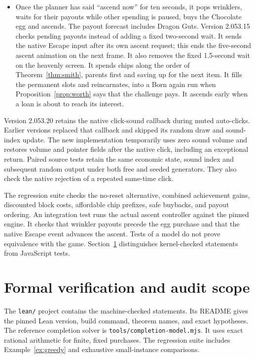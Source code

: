 \documentclass[11pt,a4paper]{article}
\numberwithin{equation}{section}
\theoremstyle{definition}
\theoremstyle{remark}
\begin{document}
\begin{itemize}
\item Once the planner has said ``ascend now'' for ten seconds, it pops wrinklers, waits for their payouts while other spending is paused, buys the Chocolate egg and ascends. The payout forecast includes Dragon Guts. Version 2.053.15 checks pending payouts instead of adding a fixed two-second wait. It sends the native Escape input after its own ascent request; this ends the five-second ascent animation on the next frame. It also removes the fixed 1.5-second wait on the heavenly screen. It spends chips along the order of Theorem~\ref{thm:smith}, parents first and saving up for the next item. It fills the permanent slots and reincarnates, into a Born again run when Proposition~\ref{prop:worth} says that the challenge pays. It ascends early when a loan is about to reach its interest.
\end{itemize}
Version 2.053.20 retains the native click-sound callback during muted auto-clicks. Earlier versions replaced that callback and skipped its random draw and sound-index update. The new implementation temporarily uses zero sound volume and restores volume and pointer fields after the native click, including an exceptional return. Paired source tests retain the same economic state, sound index and subsequent random output under both free and seeded generators. They also check the native rejection of a repeated same-time click.

The regression suite checks the no-reset alternative, combined achievement gains, discounted block costs, affordable chip prefixes, safe buybacks, and payout ordering. An integration test runs the actual ascent controller against the pinned engine. It checks that wrinkler payouts precede the egg purchase and that the native Escape event advances the ascent. Tests of a model do not prove equivalence with the game. Section~\ref{sec:formal} distinguishes kernel-checked statements from JavaScript tests.

\section{Formal verification and audit scope}\label{sec:formal}
The \texttt{lean/} project contains the machine-checked statements. Its README gives the pinned Lean version, build command, theorem names, and exact hypotheses. The reference completion solver is \texttt{tools/completion-model.mjs}. It uses exact rational arithmetic for finite, fixed purchases. The regression suite includes Example~\ref{ex:greedy} and exhaustive small-instance comparisons.
\end{document}
